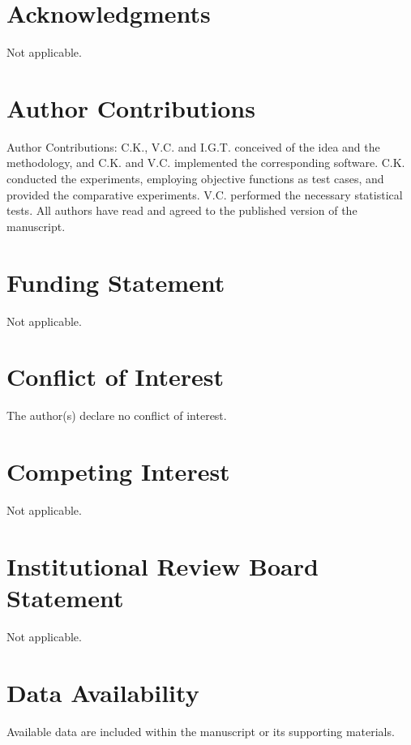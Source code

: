 \documentclass[12pt]{Definitions/academia}
\begin{document}
\section*{Acknowledgments}

Not applicable.

\section*{Author Contributions}

Author Contributions:  C.K., V.C. and I.G.T. conceived of the idea and the methodology, and C.K. and V.C. implemented the corresponding software. C.K. conducted the experiments, employing objective functions as test cases, and provided the comparative experiments. V.C. performed the necessary statistical tests. All authors have read and agreed to the published version of the manuscript.


\section*{Funding Statement}

Not applicable.


\section*{Conflict of Interest}
The author(s) declare no conflict of interest.

\section*{Competing Interest}

Not applicable.

\section*{Institutional Review Board Statement}

Not applicable.


\section*{Data Availability}

Available data are included within the manuscript or its supporting materials.
\end{document}
